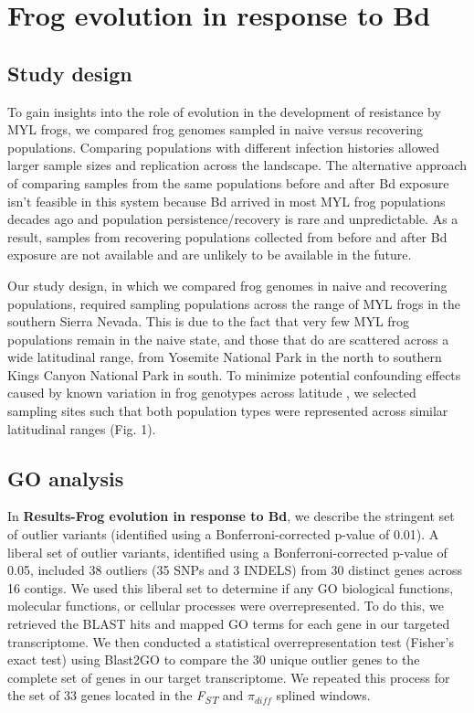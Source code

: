 \documentclass[9pt,twoside,lineno]{pnas-new}
\begin{document}
\hypertarget{frog-evolution-in-response-to-bd-2}{%
\section{Frog evolution in response to
Bd}\label{frog-evolution-in-response-to-bd-2}}

\hypertarget{study-design}{%
\subsection{Study design}\label{study-design}}

To gain insights into the role of evolution in the development of
resistance by MYL frogs, we compared frog genomes sampled in naive
versus recovering populations. Comparing populations with different
infection histories allowed larger sample sizes and replication across
the landscape. The alternative approach of comparing samples from the
same populations before and after Bd exposure isn't feasible in this
system because Bd arrived in most MYL frog populations decades ago and
population persistence/recovery is rare and unpredictable. As a result,
samples from recovering populations collected from before and after Bd
exposure are not available and are unlikely to be available in the
future.

Our study design, in which we compared frog genomes in naive and
recovering populations, required sampling populations across the range
of MYL frogs in the southern Sierra Nevada. This is due to the fact that
very few MYL frog populations remain in the naive state, and those that
do are scattered across a wide latitudinal range, from Yosemite National
Park in the north to southern Kings Canyon National Park in south. To
minimize potential confounding effects caused by known variation in frog
genotypes across latitude \citep{byrne2023}, we selected sampling sites
such that both population types were represented across similar
latitudinal ranges (Fig. 1).

\hypertarget{go-analysis}{%
\subsection{GO analysis}\label{go-analysis}}

In \textbf{Results-Frog evolution in response to Bd}, we describe the
stringent set of outlier variants (identified using a
Bonferroni-corrected p-value of 0.01). A liberal set of outlier
variants, identified using a Bonferroni-corrected p-value of 0.05,
included 38 outliers (35 SNPs and 3 INDELS) from 30 distinct genes
across 16 contigs. We used this liberal set to determine if any GO
biological functions, molecular functions, or cellular processes were
overrepresented. To do this, we retrieved the BLAST hits and mapped GO
terms for each gene in our targeted transcriptome. We then conducted a
statistical overrepresentation test (Fisher's exact test) using Blast2GO
\citep{conesa2005} to compare the 30 unique outlier genes to the
complete set of genes in our target transcriptome. We repeated this
process for the set of 33 genes located in the
\emph{F\textsubscript{ST}} and \(\pi_{diff}\) splined windows.
\end{document}
